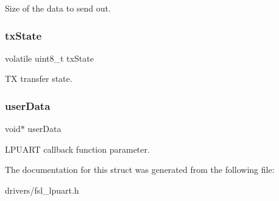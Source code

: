 Size of the data to send out. \mbox{\label{struct__lpuart__handle_a4e027f3342bad321ec60b56d164eb068}} 
\subsubsection{\texorpdfstring{txState}{txState}}
{\footnotesize\ttfamily volatile uint8\+\_\+t tx\+State}

TX transfer state. \mbox{\label{struct__lpuart__handle_a2e294dd14122c554baa0665072b4ca7a}} 
\subsubsection{\texorpdfstring{userData}{userData}}
{\footnotesize\ttfamily void$\ast$ user\+Data}

L\+P\+U\+A\+RT callback function parameter. 

The documentation for this struct was generated from the following file\+:\begin{DoxyCompactItemize}
\item 
drivers/fsl\+\_\+lpuart.\+h\end{DoxyCompactItemize}
